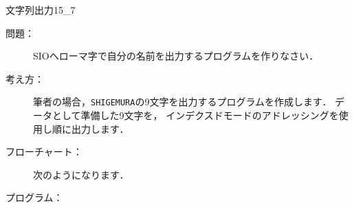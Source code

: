 \newpage
\begin{reidai}{文字列出力1}{5_7}
  \begin{description}
  \item[問題：] SIOへローマ字で自分の名前を出力するプログラムを作りなさい．

  \item[考え方：]
    筆者の場合，\texttt{SHIGEMURA}の9文字を出力するプログラムを作成します．
    データとして準備した9文字を，
    インデクスドモードのアドレッシングを使用し順に出力します．

  \item[フローチャート：]
    次のようになります．

    \begin{center}
    \end{center}

  \item[プログラム：]
  \end{description}


\end{reidai}
